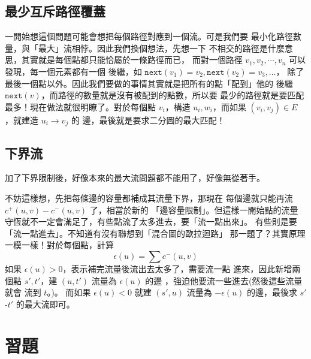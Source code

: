 \documentclass[a4paper,12pt]{book}
\begin{document}
\subsection{最少互斥路徑覆蓋}

一開始想這個問題可能會想把每個路徑對應到一個流。可是我們要
最小化路徑數量，與「最大」流相悖。因此我們換個想法，先想一下
不相交的路徑是什麼意思，其實就是每個點都只能恰屬於一條路徑而已，
而對一個路徑 $v_1, v_2, \cdots, v_n$ 可以發現，每一個元素都有一個
後繼，如 $\mathtt{next}(v_1) = v_2, \mathtt{next}(v_2) = v_3, \dots$，
除了最後一個點以外。因此我們要做的事情其實就是把所有的點「配到」他的
後繼 $\mathtt{next}(v)$，而路徑的數量就是沒有被配到的點數，所以要
最少的路徑就是要匹配最多！現在做法就很明瞭了。對於每個點 $v_i$，構造
$u_i, w_i$，而如果 $(v_i, v_j) \in E$ ，就建造 $u_i \rightarrow v_j$ 的
邊，最後就是要求二分圖的最大匹配！

\subsection{下界流}
加了下界限制後，好像本來的最大流問題都不能用了，好像無從著手。

不妨這樣想，先把每條邊的容量都補成其流量下界，那現在
每個邊就只能再流 $c^+(u, v) - c^-(u, v)$ 了，相當於新的
「邊容量限制」。但這樣一開始點的流量
守恆就不一定會滿足了，有些點流了太多進去，要「流一點出來」。
有些則是要「流一點進去」。不知道有沒有聯想到「混合圖的歐拉迴路」
那一題了？其實原理一模一樣！對於每個點，計算
\[ \epsilon(u) = \sum c^-(u, v) \]
如果 $\epsilon(u) > 0$，表示補完流量後流出去太多了，需要流一點
進來，因此新增兩個點 $s', t'$，建 $(u, t')$ 流量為 $\epsilon(u)$ 的邊
，強迫他要流一些進去(然後這些流量就會
流到 $t$。)。 而如果 $\epsilon(u) < 0$ 就建 $(s', u)$ 流量為 $-\epsilon(u)$
的邊，最後求 $s'$-$t'$ 的最大流即可。


\section{習題}

    
\end{document}
